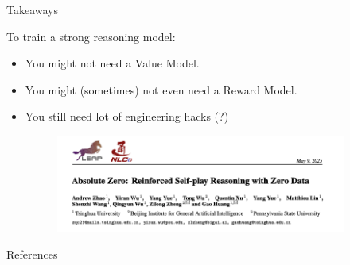 \documentclass[9pt]{beamer}
\begin{document}
\begin{frame}{Takeaways}

To train a strong reasoning model:
\vspace{1em}
\begin{itemize}
    \item You might not need a Value Model.
    \pause
    \vspace{1em}
    \item You might (sometimes) not even need a Reward Model.
    \pause
    \vspace{1em}
    \item You still need lot of engineering hacks (?)
      \begin{figure}
    \centering
    \includegraphics[width=0.9\textwidth]{figures/azr.png}
    \label{fig:trl13}
  \end{figure}
\end{itemize}

\end{frame}

\begin{frame}[t, allowframebreaks]{References}
\printbibliography[heading=none]
\end{frame}

\makeoutro
\end{document}
